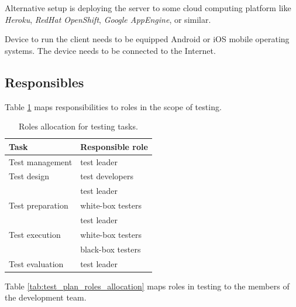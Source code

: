 \documentclass[11pt]{book}
\begin{document}
Alternative setup is deploying the server to some cloud computing platform like \emph{Heroku}, \emph{RedHat OpenShift}, \emph{Google AppEngine}, or similar. 

Device to run the client needs to be equipped Android or iOS mobile operating systems. The device needs to be connected to the Internet.

\subsection{Responsibles}

Table \ref{tab:test_plan_tasks_allocation} maps responsibilities to roles in the scope of testing.

\begin{table}[H]
    \centering
    \begin{tabular}{| l | l |}
        \hline
        Task                & Responsible role              \\ \hline

        Test management     & test leader                   \\ \hline
        
        Test design         & test developers               \\
                            & test leader                   \\ \hline
        
        Test preparation    & white-box testers             \\
                            & test leader                   \\ \hline
        
        Test execution      & white-box testers             \\
                            & black-box testers             \\ \hline
        
        Test evaluation     & test leader                   \\ \hline
    \end{tabular}
    \caption{Roles allocation for testing tasks.}
    \label{tab:test_plan_tasks_allocation}
\end{table}

Table \ref{tab:test_plan_roles_allocation} maps roles in testing to the members of the development team.
\end{document}
